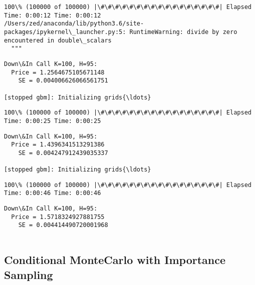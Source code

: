 \documentclass[11pt]{article}
\begin{document}
    \begin{Verbatim}[commandchars=\\\{\}]
100\% (100000 of 100000) |\#\#\#\#\#\#\#\#\#\#\#\#\#\#\#\#\#| Elapsed Time: 0:00:12 Time: 0:00:12
/Users/zed/anaconda/lib/python3.6/site-packages/ipykernel\_launcher.py:5: RuntimeWarning: divide by zero encountered in double\_scalars
  """

    \end{Verbatim}

    \begin{Verbatim}[commandchars=\\\{\}]
Down\&In Call K=100, H=95:
  Price = 1.2564675105671148
    SE = 0.004006626066561751

[stopped gbm]: Initializing grids{\ldots}

    \end{Verbatim}

    \begin{Verbatim}[commandchars=\\\{\}]
100\% (100000 of 100000) |\#\#\#\#\#\#\#\#\#\#\#\#\#\#\#\#\#| Elapsed Time: 0:00:25 Time: 0:00:25

    \end{Verbatim}

    \begin{Verbatim}[commandchars=\\\{\}]
Down\&In Call K=100, H=95:
  Price = 1.4396341513291386
    SE = 0.004247912439035337

[stopped gbm]: Initializing grids{\ldots}

    \end{Verbatim}

    \begin{Verbatim}[commandchars=\\\{\}]
100\% (100000 of 100000) |\#\#\#\#\#\#\#\#\#\#\#\#\#\#\#\#\#| Elapsed Time: 0:00:46 Time: 0:00:46

    \end{Verbatim}

    \begin{Verbatim}[commandchars=\\\{\}]
Down\&In Call K=100, H=95:
  Price = 1.5718324927881755
    SE = 0.004414490720001968


    \end{Verbatim}

    \subsection{Conditional MonteCarlo with Importance
Sampling}\label{conditional-montecarlo-with-importance-sampling}
\end{document}
